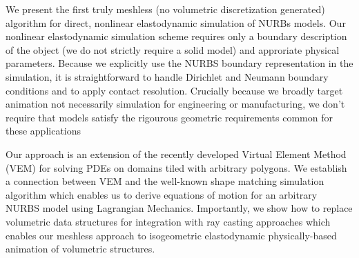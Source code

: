 We present the first truly meshless (no volumetric discretization generated) algorithm for direct, nonlinear elastodynamic simulation of NURBs models. 
Our nonlinear elastodynamic simulation scheme requires only a boundary description of the object (we do not strictly require a solid model) and
approriate physical parameters.  
Because we explicitly use the NURBS boundary representation in the simulation, it is straightforward to handle
Dirichlet and Neumann boundary conditions and to apply contact resolution. 
Crucially because we broadly target animation not necessarily simulation for engineering or manufacturing, we don't require that models
satisfy the rigourous geometric requirements common for these applications

Our approach is an extension of the recently developed Virtual Element Method (VEM) for solving PDEs on domains tiled with arbitrary polygons.
We establish a connection between VEM and the well-known shape matching simulation algorithm  which enables us 
to derive equations of motion for an arbitrary NURBS model using Lagrangian Mechanics. 
Importantly, we show how to replace volumetric data structures for integration with ray casting approaches which enables
our meshless approach to isogeometric elastodynamic physically-based animation of volumetric structures.

